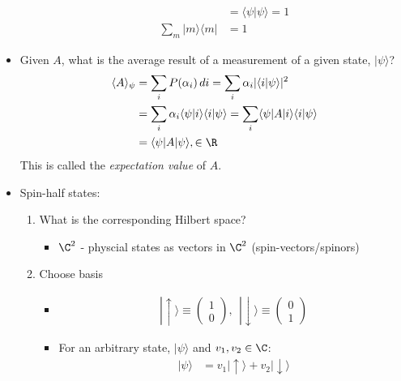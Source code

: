 \documentclass[cplx.tex]{subfiles}
\begin{document}
\begin{itemize}
\begin{itemize}
\begin{align}
                                                     &= \langle\psi|\psi\rangle = 1 \\
                    \sum_m |m\rangle\langle m| &= 1
                \end{align}
        \end{itemize}
    \item Given $A$, what is the average result of a measurement of a given state, $|\psi\rangle$?
        \begin{align}
            \langle A\rangle_\psi &= \sum_i P(\alpha_i)\,di = \sum_i \alpha_i |\langle i|\psi\rangle|^2 \\
                                  &= \sum_i \alpha_i \langle\psi| i\rangle\langle i|\psi\rangle = \sum_i \langle\psi|A|i\rangle\langle i|\psi\rangle \\
                                  &= \langle\psi|A|\psi\rangle, \in \R
        \end{align}
        This is called the \emph{expectation value} of $A$.
    \item Spin-half states:
        \begin{enumerate}
            \item What is the corresponding Hilbert space?
                \begin{itemize}
                    \item $\C^2$ - physcial states as vectors in $\C^2$ (spin-vectors/spinors)
                \end{itemize}
            \item Choose basis
                \begin{itemize}
                    \item 
                        \begin{align}
                            |\uparrow\rangle \equiv \begin{pmatrix} 1 \\ 0 \end{pmatrix}, ~~
                            |\downarrow\rangle \equiv \begin{pmatrix} 0 \\ 1 \end{pmatrix}
                        \end{align}
                    \item  For an arbitrary state, $|\psi\rangle$ and $v_1,v_2 \in \C$:
                        \begin{align}
                            |\psi\rangle &= v_1|\uparrow\rangle + v_2|\downarrow\rangle

\end{align}
\end{itemize}
\end{enumerate}
\end{itemize}
\end{document}
